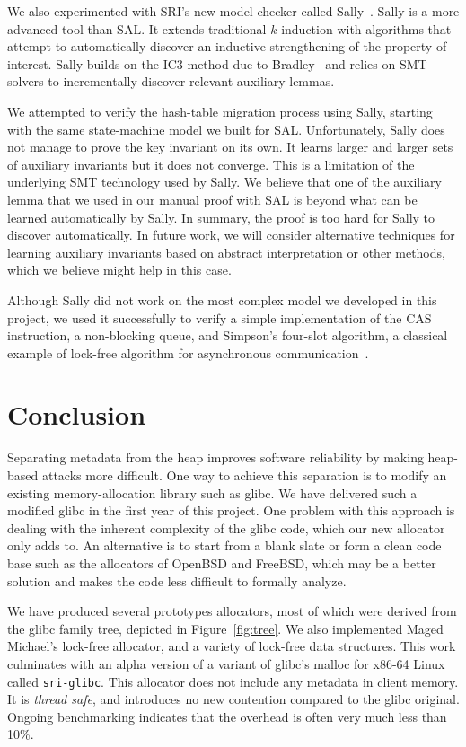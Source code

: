 \documentclass[twoside,12pt]{cslreport}
\begin{document}
We also experimented with SRI's new model checker called
Sally~\cite{Jovanovic+Dutertre:pdkind:2016}.  Sally is a more advanced
tool than SAL. It extends traditional $k$-induction with algorithms
that attempt to automatically discover an inductive strengthening of
the property of interest. Sally builds on the IC3 method due to
Bradley~\cite{bradley2011sat} and relies on SMT solvers to
incrementally discover relevant auxiliary lemmas. 

We attempted to verify the hash-table migration process using Sally,
starting with the same state-machine model we built for
SAL. Unfortunately, Sally does not manage to prove the key invariant
on its own. It learns larger and larger sets of auxiliary invariants
but it does not converge. This is a limitation of the underlying SMT
technology used by Sally. We believe that one of the auxiliary lemma
that we used in our manual proof with SAL is beyond what can be
learned automatically by Sally. In summary, the proof is too hard for
Sally to discover automatically. In future work, we will consider
alternative techniques for learning auxiliary invariants based on
abstract interpretation or other methods, which we believe might help
in this case.

Although Sally did not work on the most complex model we developed in
this project, we used it successfully to verify a simple
implementation of the CAS instruction, a non-blocking queue, and
Simpson's four-slot algorithm, a classical example of lock-free
algorithm for asynchronous communication~\cite{Simpson:four-slot:1990}.



\chapter{Conclusion}

Separating metadata from the heap improves software reliability by
making heap-based attacks more difficult. One way to achieve this
separation is to modify an existing memory-allocation library such as
glibc. We have delivered such a modified glibc in the first year of
this project. One problem with this approach is dealing with the
inherent complexity of the glibc code, which our new allocator only
adds to. An alternative is to start from a blank slate or form a clean
code base such as the allocators of OpenBSD and FreeBSD, which may be
a better solution and makes the code less difficult to formally analyze.

We have produced several prototypes allocators, most of which were
derived from the glibc family tree, depicted in Figure~\ref{fig:tree}.
We also implemented Maged Michael's lock-free allocator, and a variety
of lock-free data structures.  This work culminates with an alpha
version of a variant of glibc's malloc for x86-64 Linux called
\texttt{sri-glibc}.  This allocator does not include any metadata in
client memory.  It is {\em thread safe\/}, and introduces no new
contention compared to the glibc original. Ongoing benchmarking
indicates that the overhead is often very much less than 10\%.
\end{document}
